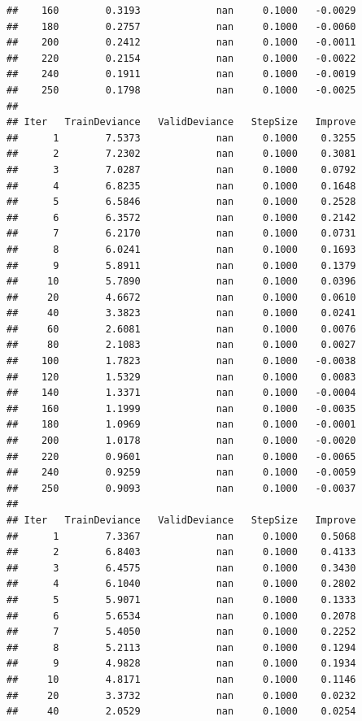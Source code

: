 \documentclass[]{book}
\begin{document}
\begin{verbatim}
##    160        0.3193             nan     0.1000   -0.0029
##    180        0.2757             nan     0.1000   -0.0060
##    200        0.2412             nan     0.1000   -0.0011
##    220        0.2154             nan     0.1000   -0.0022
##    240        0.1911             nan     0.1000   -0.0019
##    250        0.1798             nan     0.1000   -0.0025
## 
## Iter   TrainDeviance   ValidDeviance   StepSize   Improve
##      1        7.5373             nan     0.1000    0.3255
##      2        7.2302             nan     0.1000    0.3081
##      3        7.0287             nan     0.1000    0.0792
##      4        6.8235             nan     0.1000    0.1648
##      5        6.5846             nan     0.1000    0.2528
##      6        6.3572             nan     0.1000    0.2142
##      7        6.2170             nan     0.1000    0.0731
##      8        6.0241             nan     0.1000    0.1693
##      9        5.8911             nan     0.1000    0.1379
##     10        5.7890             nan     0.1000    0.0396
##     20        4.6672             nan     0.1000    0.0610
##     40        3.3823             nan     0.1000    0.0241
##     60        2.6081             nan     0.1000    0.0076
##     80        2.1083             nan     0.1000    0.0027
##    100        1.7823             nan     0.1000   -0.0038
##    120        1.5329             nan     0.1000    0.0083
##    140        1.3371             nan     0.1000   -0.0004
##    160        1.1999             nan     0.1000   -0.0035
##    180        1.0969             nan     0.1000   -0.0001
##    200        1.0178             nan     0.1000   -0.0020
##    220        0.9601             nan     0.1000   -0.0065
##    240        0.9259             nan     0.1000   -0.0059
##    250        0.9093             nan     0.1000   -0.0037
## 
## Iter   TrainDeviance   ValidDeviance   StepSize   Improve
##      1        7.3367             nan     0.1000    0.5068
##      2        6.8403             nan     0.1000    0.4133
##      3        6.4575             nan     0.1000    0.3430
##      4        6.1040             nan     0.1000    0.2802
##      5        5.9071             nan     0.1000    0.1333
##      6        5.6534             nan     0.1000    0.2078
##      7        5.4050             nan     0.1000    0.2252
##      8        5.2113             nan     0.1000    0.1294
##      9        4.9828             nan     0.1000    0.1934
##     10        4.8171             nan     0.1000    0.1146
##     20        3.3732             nan     0.1000    0.0232
##     40        2.0529             nan     0.1000    0.0254

\end{verbatim}
\end{document}
